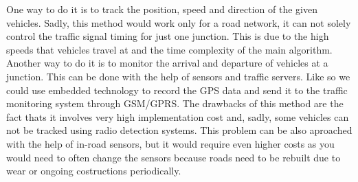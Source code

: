 \documentclass[17pt]{report}
\begin{document}
\indent \indent
One way to do it is to track the position, speed and direction of the given
vehicles. Sadly, this method would work only for a road network,
it can not solely control the traffic signal timing for just one junction. 
This is due to the high speeds that vehicles travel at and the time 
complexity of the  main algorithm.\\ 
\indent \indent
Another way to do it is to monitor the arrival and departure of vehicles at a
junction. This can be done with the help of sensors and traffic servers.
Like so we could use embedded technology to record the GPS data and send it to
the traffic monitoring system through GSM/GPRS. The drawbacks of this method
are the fact thats it involves very high implementation cost and, sadly, some
vehicles can not be tracked using radio detection systems. This problem can
be also aproached with the help of in-road sensors, but it would require even higher 
costs as you would need to often change the sensors because roads need to be
rebuilt due to wear or ongoing costructions periodically.
\end{document}
